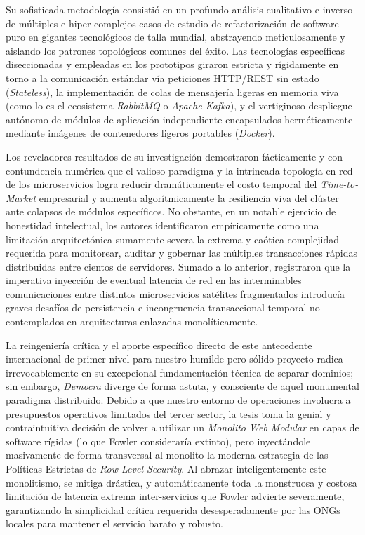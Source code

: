 Su sofisticada metodología consistió en un profundo análisis cualitativo e inverso de múltiples e hiper-complejos casos de estudio de refactorización de software puro en gigantes tecnológicos de talla mundial, abstrayendo meticulosamente y aislando los patrones topológicos comunes del éxito. Las tecnologías específicas diseccionadas y empleadas en los prototipos giraron estricta y rígidamente en torno a la comunicación estándar vía peticiones HTTP/REST sin estado (\textit{Stateless}), la implementación de colas de mensajería ligeras en memoria viva (como lo es el ecosistema \textit{RabbitMQ} o \textit{Apache Kafka}), y el vertiginoso despliegue autónomo de módulos de aplicación independiente encapsulados herméticamente mediante imágenes de contenedores ligeros portables (\textit{Docker}). 

Los reveladores resultados de su investigación demostraron fácticamente y con contundencia numérica que el valioso paradigma y la intrincada topología en red de los microservicios logra reducir dramáticamente el costo temporal del \textit{Time-to-Market} empresarial y aumenta algorítmicamente la resiliencia viva del clúster ante colapsos de módulos específicos. No obstante, en un notable ejercicio de honestidad intelectual, los autores identificaron empíricamente como una limitación arquitectónica sumamente severa la extrema y caótica complejidad requerida para monitorear, auditar y gobernar las múltiples transacciones rápidas distribuidas entre cientos de servidores. Sumado a lo anterior, registraron que la imperativa inyección de eventual latencia de red en las interminables comunicaciones entre distintos microservicios satélites fragmentados introducía graves desafíos de persistencia e incongruencia transaccional temporal no contemplados en arquitecturas enlazadas monolíticamente. 

La reingeniería crítica y el aporte específico directo de este antecedente internacional de primer nivel para nuestro humilde pero sólido proyecto radica irrevocablemente en su excepcional fundamentación técnica de separar dominios; sin embargo, \textit{Democra} diverge de forma astuta, y consciente de aquel monumental paradigma distribuido. Debido a que nuestro entorno de operaciones involucra a presupuestos operativos limitados del tercer sector, la tesis toma la genial y contraintuitiva decisión de volver a utilizar un \textit{Monolito Web Modular} en capas de software rígidas (lo que Fowler consideraría extinto), pero inyectándole masivamente de forma transversal al monolito la moderna estrategia de las Políticas Estrictas de \textit{Row-Level Security}. Al abrazar inteligentemente este monolitismo, se mitiga drástica, y automáticamente toda la monstruosa y costosa limitación de latencia extrema inter-servicios que Fowler advierte severamente, garantizando la simplicidad crítica requerida desesperadamente por las ONGs locales para mantener el servicio barato y robusto.

